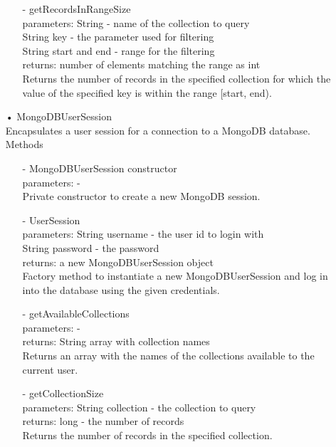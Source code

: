 \documentclass[oneside, english, final]{design}
\begin{document}
\begin{itemize}
\begin{itemize}
		      \item[-]getRecordsInRangeSize
		            \\parameters: String - name of the collection to query
		            \\String key - the parameter used for filtering
		            \\String start and end - range for the filtering
		            \\returns: number of elements matching the range as int
		            \\Returns the number of records in the specified
		            collection for which the value of the specified
		            key is within the range [start, end).
	      \end{itemize}



	\item[•]MongoDBUserSession
	      \\Encapsulates a user session for a connection to a MongoDB database.
	      \\Methods
	      \begin{itemize}
		      \item[-]MongoDBUserSession constructor
		            \\parameters: -
		            \\Private constructor to create a new MongoDB session.

		      \item[-]UserSession
		            \\parameters: String username - the user id to login with
		            \\String password - the password
		            \\returns: a new MongoDBUserSession object
		            \\Factory method to instantiate a new MongoDBUserSession and log in into the database using the given credentials.

		      \item[-]getAvailableCollections
		            \\parameters: -
		            \\returns: String array with collection names
		            \\Returns an array with the names of the collections available to the current user.

		      \item[-]getCollectionSize
		            \\parameters: String collection - the collection to query
		            \\returns: long - the number of records
		            \\Returns the number of records in the specified collection.


\end{itemize}
\end{itemize}
\end{document}
